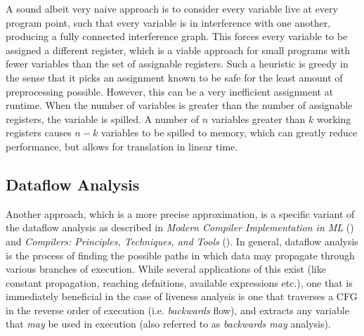 \documentclass{article}
\begin{document}
A sound albeit very naive approach is to consider every variable live at every program point, such that every variable is in interference with one another, producing a fully connected interference graph.
This forces every variable to be assigned a different register, which is a viable approach for small programs with fewer variables than the set of assignable registers.
Such a heuristic is greedy in the sense that it picks an assignment known to be safe for the least amount of preprocessing possible. However, this can be a very inefficient assignment at runtime. 
When the number of variables is greater than the number of assignable registers, the variable is spilled. A number of \(n\)  variables greater than \(k\) working registers causes \(n-k\) variables to be spilled to memory, %
which can greatly reduce performance, but  allows for translation in linear time. %

\subsection{Dataflow Analysis}


Another approach, which is a more precise approximation, is a specific variant of the dataflow analysis as described in \textit{Modern Compiler Implementation in ML} (\cite{tiger}) and \textit{Compilers: Principles, Techniques, and Tools} (\cite{dragon}). In general, dataflow analysis is the process of finding the possible paths in which data may propagate through various branches of execution.  While several applications of this exist (like constant propagation, reaching defnitions, available expressions etc.), one that is immediately beneficial in the case of liveness analysis is one that traverses a CFG in the reverse order of execution (i.e.  \textit{backwards} flow), and extracts any variable that \textit{may} be used in execution (also referred to as \textit{backwards may} analysis). %
\end{document}
